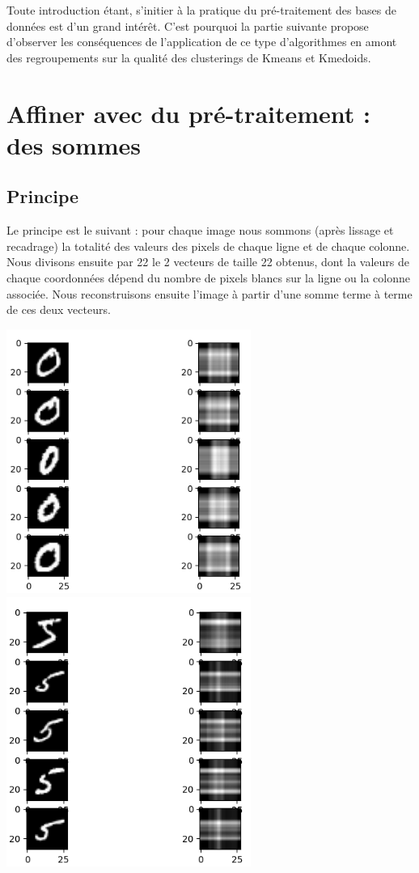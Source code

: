 \documentclass{article}
\begin{document}
\vspace{2mm}
Toute introduction étant, s'initier à la pratique du pré-traitement des bases de données est d'un grand intérêt. C'est pourquoi la partie suivante propose d'observer les conséquences de l'application de ce type d'algorithmes en amont des regroupements sur la qualité des clusterings de Kmeans et Kmedoids.


\section{Affiner avec du pré-traitement : des sommes}
\subsection{Principe}

Le principe est le suivant : pour chaque image nous sommons (après lissage et recadrage) la totalité des valeurs des pixels de chaque ligne et de chaque colonne.  Nous divisons ensuite par 22 le 2 vecteurs de taille 22 obtenus,  dont la valeurs de chaque coordonnées dépend du nombre de pixels blancs sur la ligne ou la colonne associée. Nous reconstruisons ensuite l'image à partir d'une somme terme à terme de ces deux vecteurs.

\begin{center}
    \includegraphics[width=0.6\textwidth]{./Images/spe_pre_pro_0.png}
    \includegraphics[width=0.6\textwidth]{./Images/spe_pre_pro_5.png}
\end{center}
\end{document}
